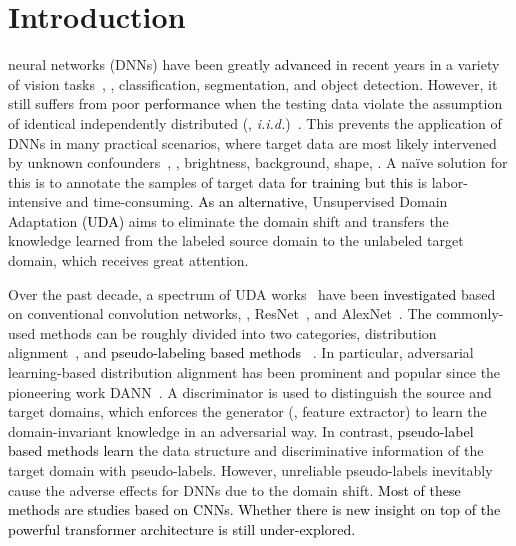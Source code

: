 \documentclass[journal]{IEEEtran}
\newcommand{\tcb}{\textcolor{black}}
\newcommand{\tco}{\textcolor{black}}
\begin{document}
\section{Introduction}
 neural networks (DNNs) have been greatly \tcb{advanced} in recent years in a variety of vision tasks~\cite{dosovitskiy2020imageViT,carion2020endDETR,he2017maskMASKRCNN,redmon2016youYOLO,cheng2022masked,li2022exploring,chu2021twinsTwins}, \egno, classification, segmentation, and object detection. 
However, it still suffers from poor \tcb{performance} when the testing data violate the assumption of identical independently distributed (\ieno, \textit{i.i.d.})~\cite{zhou2022domainSurveyKaiyang,wang2022generalizingSurveyJingdong}. This prevents the application of DNNs in many practical scenarios, where target data are most likely intervened by unknown confounders~\cite{li2021confounderCICF, zhang2022GE-ViTs}, \egno, brightness, background, shape, \etcno. A na\"ive solution for this is to annotate the samples of target data \tcb{for training} but \tcb{this} is labor-intensive and time-consuming. \tcb{As an alternative}, Unsupervised Domain Adaptation \tco{(UDA)} aims to eliminate the domain shift and transfers the knowledge learned from the labeled source domain to the unlabeled target domain, which receives great attention. 

Over the past decade, a spectrum of UDA works~\cite{ganin2016domain_dann,borgwardt2006integratingMMD,ren2022multi,feng2021complementary,moon2022multistage,bai2021hierarchical}  have been \tcb{investigated} based on conventional convolution networks, \egno, ResNet~\cite{he2016deepResNet}, and AlexNet~\cite{krizhevsky2017imagenetAlexNet}. The commonly-used methods can be roughly divided into two categories, distribution alignment~\cite{borgwardt2006integratingMMD,wei2021toalign,tzeng2017adversarialADDA,ganin2016domain_dann}, and \tcb{pseudo-labeling based methods}
~\cite{saito2017asymmetric,zou2019confidenceCRST,gu2020spherical}. In particular, adversarial learning-based distribution alignment has been prominent and popular since the pioneering work DANN~\cite{ganin2016domain_dann}. A discriminator is used to distinguish the source and target domains, which enforces the generator (\ieno, feature extractor) to learn the domain-invariant knowledge in an adversarial way. In contrast, \tcb{pseudo-label based methods learn} the data structure and discriminative information of the target domain with pseudo-labels. However, unreliable pseudo-labels inevitably cause the adverse effects for DNNs due to the domain shift. \tcb{Most of these methods are studies based on CNNs. Whether there is new insight on top of the powerful transformer architecture is still under-explored. }
\end{document}
